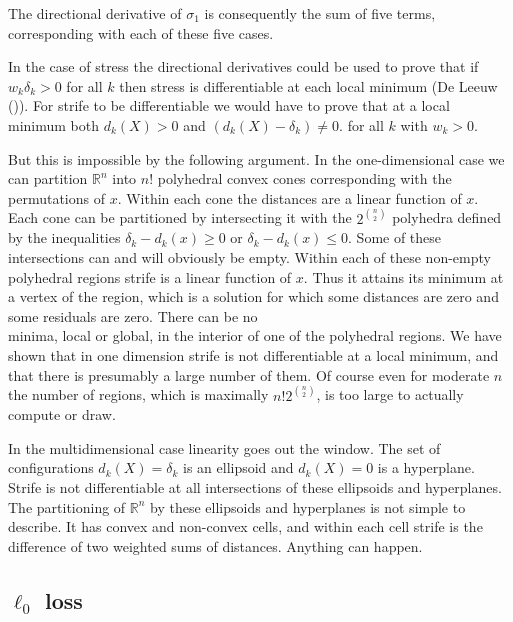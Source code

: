 \documentclass[
  12pt,
  letterpaper,
  DIV=11,
  numbers=noendperiod]{scrartcl}
\theoremstyle{plain}
\theoremstyle{remark}
\begin{document}
The directional derivative of \(\sigma_1\) is consequently the sum of
five terms, corresponding with each of these five cases.

In the case of stress the directional derivatives could be used to prove
that if \(w_k\delta_k>0\) for all \(k\) then stress is differentiable at
each local minimum (De Leeuw ()). For
strife to be differentiable we would have to prove that at a local
minimum both \(d_k(X)>0\) and \((d_k(X)-\delta_k)\not= 0\). for all
\(k\) with \(w_k>0\).

But this is impossible by the following argument. In the one-dimensional
case we can partition \(\mathbb{R}^n\) into \(n!\) polyhedral convex
cones corresponding with the permutations of \(x\). Within each cone the
distances are a linear function of \(x\). Each cone can be partitioned
by intersecting it with the \(2^\binom{n}{2}\) polyhedra defined by the
inequalities \(\delta_k-d_k(x)\geq 0\) or \(\delta_k-d_k(x)\leq 0\).
Some of these intersections can and will obviously be empty. Within each
of these non-empty polyhedral regions strife is a linear function of
\(x\). Thus it attains its minimum at a vertex of the region, which is a
solution for which some distances are zero and some residuals are zero.
There can be no\\
minima, local or global, in the interior of one of the polyhedral
regions. We have shown that in one dimension strife is not
differentiable at a local minimum, and that there is presumably a large
number of them. Of course even for moderate \(n\) the number of regions,
which is maximally \(n!2^\binom{n}{2}\), is too large to actually
compute or draw.

In the multidimensional case linearity goes out the window. The set of
configurations \(d_k(X)=\delta_k\) is an ellipsoid and \(d_k(X)=0\) is a
hyperplane. Strife is not differentiable at all intersections of these
ellipsoids and hyperplanes. The partitioning of \(\mathbb{R}^n\) by
these ellipsoids and hyperplanes is not simple to describe. It has
convex and non-convex cells, and within each cell strife is the
difference of two weighted sums of distances. Anything can happen.

\subsection{\texorpdfstring{\(\ell_0\)
loss}{\textbackslash ell\_0 loss}}\label{ell_0-loss}
\end{document}

